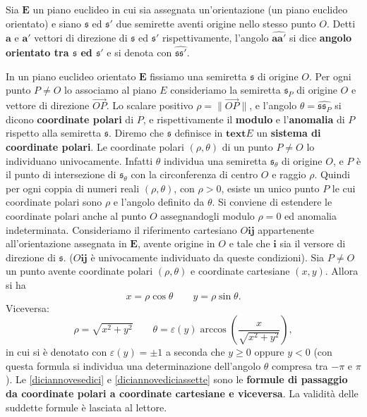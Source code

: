 \documentclass{article}
\theoremstyle{plain}
\theoremstyle{definition}
\theoremstyle{remark}
\begin{document}
\vspace{10pt}

Sia $\mathbf{E}$ un piano euclideo in cui sia assegnata un'orientazione (un piano euclideo orientato) e siano 
$\mathfrak{s}$ ed $\mathfrak{s}'$ due semirette aventi origine nello stesso punto $O$. Detti 
$\mathbf{a}$ e $\mathbf{a}'$ vettori di direzione di $\mathfrak{s}$ ed $\mathfrak{s}'$ rispettivamente, 
l'angolo $\widehat{\mathbf{a}\mathbf{a}'}$ si dice \textbf{angolo orientato tra $\mathfrak{s}$ ed $\mathfrak{s}'$} e si denota 
con $\widehat{\mathfrak{s}\mathfrak{s}'}$.

\vspace{10pt}

In un piano euclideo orientato $\mathbf{E}$ fissiamo una semiretta $\mathfrak{s}$ di origine $O$. 
Per ogni punto $P \neq O$ lo associamo al piano $E$ consideriamo la semiretta $\mathfrak{s}_P$ di origine 
$O$ e vettore di direzione $\overrightarrow{OP}$. Lo scalare positivo $\rho = \|\overrightarrow{OP}\|$, 
e l'angolo $\theta = \widehat{\mathfrak{s}\mathfrak{s}_P}$ si dicono \textbf{coordinate polari} di $P$, e 
rispettivamente il \textbf{modulo} e l'\textbf{anomalia} di $P$ rispetto alla semiretta $\mathfrak{s}$. 
Diremo che $\mathfrak{s}$ definisce in $\mathbf{text}E$ un \textbf{sistema di coordinate polari}.
Le coordinate polari $(\rho, \theta)$ di un punto $P \neq O$ lo individuano univocamente. Infatti $\theta$ 
individua una semiretta $\mathfrak{s}_\theta$ di origine $O$, e $P$ è il punto di intersezione di 
$\mathfrak{s}_\theta$ con la circonferenza di centro $O$ e raggio $\rho$.
Quindi per ogni coppia di numeri reali $(\rho, \theta)$, con $\rho > 0$, esiste un unico punto $P$ le cui 
coordinate polari sono $\rho$ e l'angolo definito da $\theta$. Si conviene di estendere le coordinate polari 
anche al punto $O$ assegnandogli modulo $\rho = 0$ ed anomalia indeterminata.
Consideriamo il riferimento cartesiano $O\mathbf{ij}$ appartenente all'orientazione assegnata in 
$\mathbf{E}$, avente origine in $O$ e tale che $\mathbf{i}$ sia il versore di direzione di $\mathfrak{s}$. 
($O\mathbf{ij}$ è univocamente individuato da queste condizioni). Sia $P \neq O$ un punto avente coordinate 
polari $(\rho, \theta)$ e coordinate cartesiane $(x, y)$. Allora si ha
\begin{equation}\label{diciannovesedici}
x = \rho \cos \theta \quad\quad y = \rho \sin \theta.    
\end{equation}
Viceversa:
\begin{equation}\label{diciannovediciassette}
\rho = \sqrt{x^2 + y^2}\quad\quad\theta = \varepsilon(y) \arccos \left( \frac{x}{\sqrt{x^2 + y^2}} \right),     
\end{equation}
in cui si è denotato con $\varepsilon(y) = \pm 1$ a seconda che $y \geq 0$ oppure $y < 0$ (con questa formula si 
individua una determinazione dell'angolo $\theta$ compresa tra $-\pi$ e $\pi$).
Le \ref{diciannovesedici} e \ref{diciannovediciassette} sono le 
\textbf{formule di passaggio da coordinate polari a coordinate cartesiane e viceversa}. La validità delle 
suddette formule è lasciata al lettore.
\end{document}
